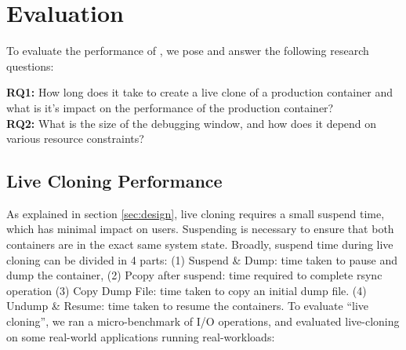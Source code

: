 \section{Evaluation}
\label{sec:evaluation}

To evaluate the performance of \parikshan, we pose and answer the following research questions:

\noindent \textbf{RQ1:} How long does it take to create a live clone of a production container and what is it's impact on the performance of the production container?\\
\noindent \textbf{RQ2:} What is the size of the debugging window, and how does it depend on various resource constraints? 

\subsection{Live Cloning Performance}
\label{sec:performance}

As explained in section \ref{sec:design}, live cloning requires a small suspend time, which has minimal impact on users.
Suspending is necessary to ensure that both containers are in the exact same system state.
Broadly, suspend time during live cloning can be divided in 4 parts: 
(1) Suspend \& Dump: time taken to pause and dump the container, 
(2) Pcopy after suspend: time required to complete rsync operation 
(3) Copy Dump File: time taken to copy an initial dump file.
(4) Undump \& Resume: time taken to resume the containers. 
To evaluate ``live cloning'', we ran a micro-benchmark of I/O operations, and evaluated live-cloning on some real-world applications running real-workloads:



